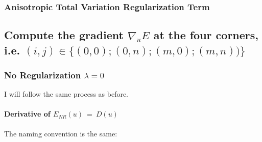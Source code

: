 \documentclass{report}
\begin{document}
				\closesection
			\closesection
			\subsubsection{Anisotropic Total Variation Regularization Term}
			\startsubsection
			\closesection
		\closesection
		
		\subsection{Compute the gradient $\nabla_u E$ at the four corners, \\ i.e. $(i,j) \in \{ (0,0); (0,n);(m,0);(m,n)) \}$}
		\startsubsection
			\subsubsection{No Regularization $\lambda = 0$}
			\startsubsection
				I will follow the same process as before.
				\vspace{-0.4cm} \paragraph{Derivative of  $E_{NR}(u) \ = \ D(u)$}
				\startsubsection
					\vspace{0.2cm} The naming convention is the same:
\end{document}
